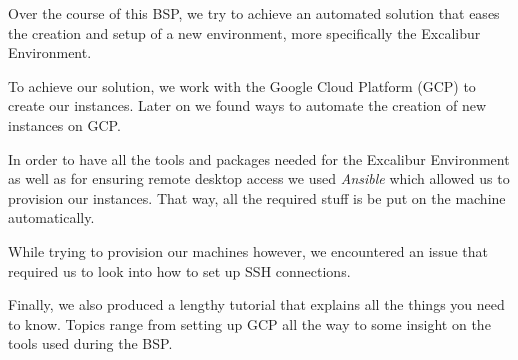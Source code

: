 %
%
%
%

Over the course of this BSP, we try to achieve an automated solution
that eases the creation and setup of a new environment, more
specifically the Excalibur Environment.

To achieve our solution, we work with the Google Cloud Platform (GCP)
to create our instances. Later on we found ways to automate the
creation of new instances on GCP. 

In order to have all the tools and packages needed for the Excalibur
Environment as well as for ensuring remote desktop access we used
\textit{Ansible} which allowed us to provision our instances. That
way, all the required stuff is be put on the machine automatically.

While trying to provision our machines however, we encountered an
issue that required us to look into how to set up SSH connections.

Finally, we also produced a lengthy tutorial that explains all the
things you need to know. Topics range from setting up GCP all the way
to some insight on the tools used during the BSP.
